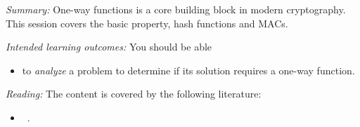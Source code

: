 \emph{Summary:}
One-way functions is a core building block in modern cryptography.
This session covers the basic property, hash functions and \acp{MAC}.

\emph{Intended learning outcomes:}
You should be able
\begin{itemize}
  \item to \emph{analyze} a problem to determine if its solution requires a 
    one-way function.
\end{itemize}

\emph{Reading:}
The content is covered by the following literature:
\begin{itemize}
  \item {}~\cite{EOCS}.
\end{itemize}
